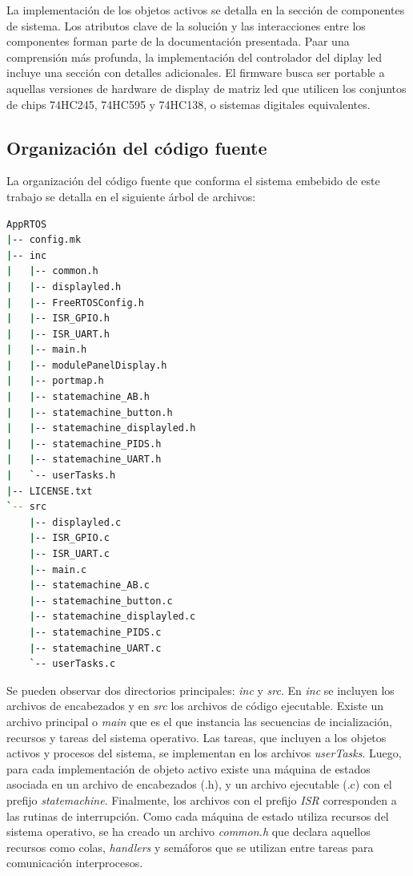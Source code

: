 La implementación de los objetos activos se detalla en la sección de componentes de sistema. Los atributos clave de la solución y las interacciones entre los componentes forman parte de la documentación presentada. Paar una comprensión más profunda, la implementación del controlador del diplay led incluye una sección con detalles adicionales. El firmware busca ser portable a aquellas versiones de hardware de display de matriz led que utilicen los conjuntos de chips 74HC245, 74HC595 y 74HC138, o sistemas digitales equivalentes. \\



\subsection{Organización del código fuente}
La organización del código fuente que conforma el sistema embebido de este trabajo se detalla en el siguiente árbol de archivos:

\begin{lstlisting}[caption=Árbol de archivos del código fuente del sistema., language=Bash, 
	backgroundcolor=\color{mygray},
	]
AppRTOS
|-- config.mk
|-- inc
|   |-- common.h
|   |-- displayled.h
|   |-- FreeRTOSConfig.h
|   |-- ISR_GPIO.h
|   |-- ISR_UART.h
|   |-- main.h
|   |-- modulePanelDisplay.h
|   |-- portmap.h
|   |-- statemachine_AB.h
|   |-- statemachine_button.h
|   |-- statemachine_displayled.h
|   |-- statemachine_PIDS.h
|   |-- statemachine_UART.h
|   `-- userTasks.h
|-- LICENSE.txt
`-- src
    |-- displayled.c
    |-- ISR_GPIO.c
    |-- ISR_UART.c
    |-- main.c
    |-- statemachine_AB.c
    |-- statemachine_button.c
    |-- statemachine_displayled.c
    |-- statemachine_PIDS.c
    |-- statemachine_UART.c
    `-- userTasks.c
\end{lstlisting}

Se pueden observar dos directorios principales: \textit{inc} y \textit{src}. En \textit{inc} se incluyen los archivos de encabezados y en \textit{src} los archivos de código ejecutable. Existe un archivo principal o \textit{main} que es el que instancia las secuencias de incialización, recursos y tareas del sistema operativo. Las tareas, que incluyen a los objetos activos y procesos del sistema, se implementan en los archivos \textit{userTasks}. Luego, para cada implementación de objeto activo existe una máquina de estados asociada en un archivo de encabezados (.h),  y un archivo ejecutable (.c) con el prefijo \textit{statemachine}. Finalmente, los archivos con el prefijo \textit{ISR} corresponden a las rutinas de interrupción. Como cada máquina de estado utiliza recursos del sistema operativo, se ha creado un archivo \textit{common.h} que declara aquellos recursos como colas, \textit{handlers} y semáforos que se utilizan entre tareas para comunicación interprocesos.\\

